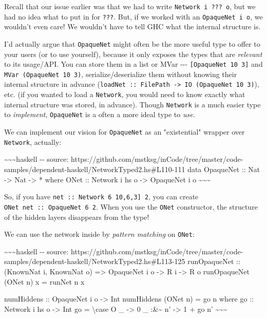 \documentclass[]{article}
\begin{document}
Recall that our issue earlier was that we had to write
\texttt{Network\ i\ ???\ o}, but we had no idea what to put in for \texttt{???}.
But, if we worked with an \texttt{OpaqueNet\ i\ o}, we wouldn't even care! We
wouldn't have to tell GHC what the internal structure is.

I'd actually argue that \texttt{OpaqueNet} might often be the more useful type
to offer to your users (or to use yourself), because it only exposes the types
that are \emph{relevant} to its usage/API. You can store them in a list or MVar
-\/-\/- \texttt{{[}OpaqueNet\ 10\ 3{]}} and \texttt{MVar\ (OpaqueNet\ 10\ 3)},
serialize/deserialize them without knowing their internal structure in advance
(\texttt{loadNet\ ::\ FilePath\ -\textgreater{}\ IO\ (OpaqueNet\ 10\ 3)}), etc.
(if you wanted to load a \texttt{Network}, you would need to know exactly what
internal structure was stored, in advance). Though \texttt{Network} is a much
easier type to \emph{implement}, \texttt{OpaqueNet} is a often a more ideal type
to \emph{use}.

We can implement our vision for \texttt{OpaqueNet} as an "existential" wrapper
over \texttt{Network}, actually:

\textasciitilde{}\textasciitilde{}\textasciitilde{}haskell -\/- source:
https://github.com/mstksg/inCode/tree/master/code-samples/dependent-haskell/NetworkTyped2.hs\#L110-111
data OpaqueNet :: Nat -\textgreater{} Nat -\textgreater{} * where ONet ::
Network i hs o -\textgreater{} OpaqueNet i o
\textasciitilde{}\textasciitilde{}\textasciitilde{}

So, if you have \texttt{net\ ::\ Network\ 6\ \textquotesingle{}{[}10,6,3{]}\ 2},
you can create \texttt{ONet\ net\ ::\ OpaqueNet\ 6\ 2}. When you use the
\texttt{ONet} constructor, the structure of the hidden layers disappears from
the type!

We can use the network inside by \emph{pattern matching} on \texttt{ONet}:

\textasciitilde{}\textasciitilde{}\textasciitilde{}haskell -\/- source:
https://github.com/mstksg/inCode/tree/master/code-samples/dependent-haskell/NetworkTyped2.hs\#L113-125
runOpaqueNet :: (KnownNat i, KnownNat o) =\textgreater{} OpaqueNet i o
-\textgreater{} R i -\textgreater{} R o runOpaqueNet (ONet n) x = runNet n x

numHiddens :: OpaqueNet i o -\textgreater{} Int numHiddens (ONet n) = go n where
go :: Network i hs o -\textgreater{} Int go = \textbackslash{}case O \_
-\textgreater{} 0 \_ :\&\textasciitilde{} n' -\textgreater{} 1 + go n'
\textasciitilde{}\textasciitilde{}\textasciitilde{}
\end{document}
